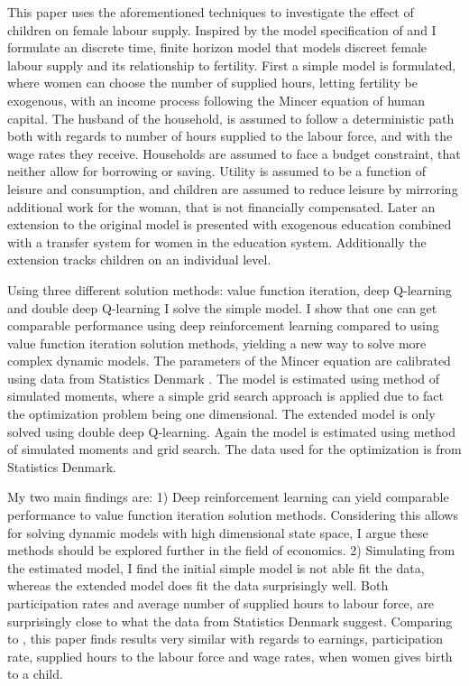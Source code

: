 This paper uses the aforementioned techniques to investigate the effect of children on female labour supply. Inspired by the model specification of \textcite{francesconi_joint_2002} and \textcite{adda_career_2011} I formulate an discrete time, finite horizon model that models discreet female labour supply and its relationship to fertility. First a simple model is formulated, where women can choose the number of supplied hours, letting fertility be exogenous, with an income process following the Mincer equation of human capital. The husband of the household, is assumed to follow a deterministic path both with regards to number of hours supplied to the labour force, and with the wage rates they receive. Households are assumed to face a budget constraint, that neither allow for borrowing or saving. Utility is assumed to be a function of leisure and consumption, and children are assumed to reduce leisure by mirroring additional work for the woman, that is not financially compensated. Later an extension to the original model is presented with exogenous education combined with a transfer system for women in the education system. Additionally the extension tracks children on an individual level.

Using three different solution methods: value function iteration, deep Q-learning and double deep Q-learning I solve the simple model. I show that one can get comparable performance using deep reinforcement learning compared to using value function iteration solution methods, yielding a new way to solve more complex dynamic models. The parameters of the Mincer equation are calibrated using data from Statistics Denmark . The model is estimated using method of simulated moments, where a simple grid search approach is applied due to fact the optimization problem being one dimensional. The extended model is only solved using double deep Q-learning. Again the model is estimated using method of simulated moments and grid search. The data used for the optimization is from Statistics Denmark.

My two main findings are: 1) Deep reinforcement learning can yield comparable performance to value function iteration solution methods. Considering this allows for solving dynamic models with high dimensional state space, I argue these methods should be explored further in the field of economics. 2) Simulating from the estimated model, I find the initial simple model is not able fit the data, whereas the extended model does fit the data surprisingly well. Both participation rates and average number of supplied hours to labour force, are surprisingly close to what the data from Statistics Denmark suggest. Comparing to  \textcite{kleven_children_2019}, this paper finds results very similar with regards to earnings, participation rate, supplied hours to the labour force and wage rates, when women gives birth to a child.


